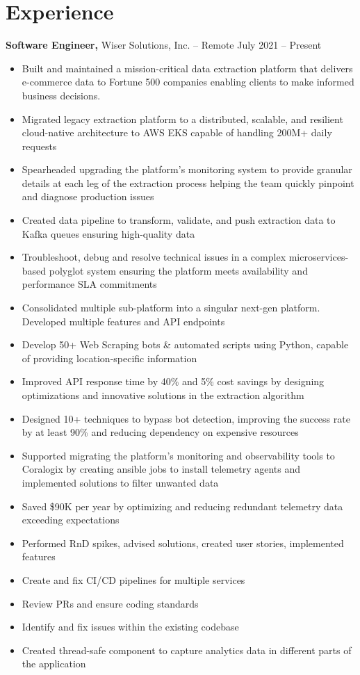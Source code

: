 \documentclass[11pt]{article}       %
\begin{document}
\section*{Experience}
\textbf{Software Engineer,} {Wiser Solutions, Inc.} -- Remote \hfill July 2021 -- Present \\
\vspace{-9pt}
\begin{itemize}
  \item Built and maintained a mission-critical data extraction platform that delivers e-commerce data to Fortune 500 companies enabling clients to make informed business decisions.
  \item Migrated legacy extraction platform to a distributed, scalable, and resilient cloud-native architecture to AWS EKS capable of handling 200M+ daily requests
  \item Spearheaded upgrading the platform's monitoring system to provide granular details at each leg of the extraction process helping the team quickly pinpoint and diagnose production issues
  \item Created data pipeline to transform, validate, and push extraction data to Kafka queues ensuring high-quality data
  \item Troubleshoot, debug and resolve technical issues in a complex microservices-based polyglot system ensuring the platform meets availability and performance SLA commitments
  \item Consolidated multiple sub-platform into a singular next-gen platform. Developed multiple features and API endpoints
  \item Develop 50+ Web Scraping bots & automated scripts using Python, capable of providing location-specific information
  \item Improved API response time by 40\% and 5\% cost savings by designing optimizations and innovative solutions in the extraction algorithm
  \item Designed 10+ techniques to bypass bot detection, improving the success rate by at least 90\% and reducing dependency on expensive resources
  \item Supported migrating the platform's monitoring and observability tools to Coralogix by creating ansible jobs to install telemetry agents and implemented solutions to filter unwanted data
  \item Saved \$90K per year by optimizing and reducing redundant telemetry data exceeding expectations
  \item Performed RnD spikes, advised solutions, created user stories, implemented features
  \item Create and fix CI/CD pipelines for multiple services
  \item Review PRs and ensure coding standards
  \item Identify and fix issues within the existing codebase
  \item Created thread-safe component to capture analytics data in different parts of the application
\end{itemize}
\end{document}
